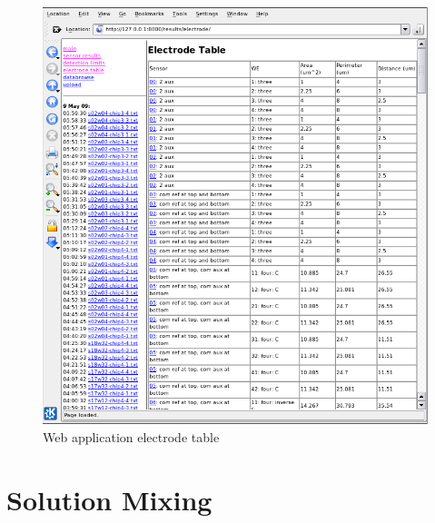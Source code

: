 \begin{figure}
	\centering
	\includegraphics[width=\linewidth]{figures/web-electrodes.png}
	\caption{Web application electrode table}
\end{figure}

\chapter{Solution Mixing}

